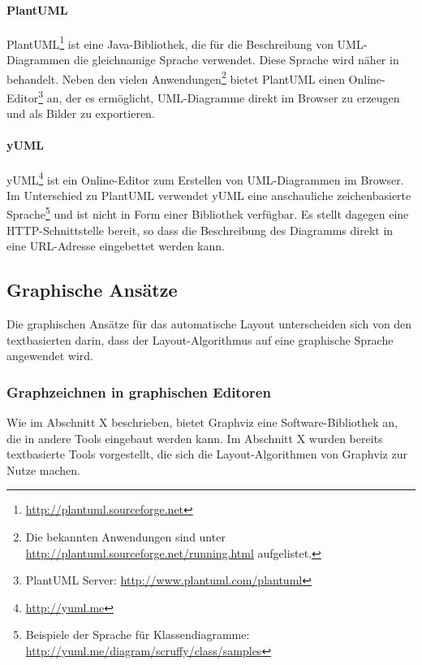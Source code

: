 \paragraph{PlantUML}


PlantUML\footnote{\url{http://plantuml.sourceforge.net}} ist eine Java-Bibliothek, die für die Beschreibung von UML-Diagrammen die gleichnamige Sprache verwendet. Diese Sprache wird näher in \cite{Roques10Drawing} behandelt. Neben den vielen Anwendungen\footnote{Die bekannten Anwendungen sind unter \url{http://plantuml.sourceforge.net/running.html} aufgelistet.} bietet PlantUML einen Online-Editor\footnote{PlantUML Server: \url{http://www.plantuml.com/plantuml}} an, der es ermöglicht, UML-Diagramme direkt im Browser zu erzeugen und als Bilder zu exportieren.

\paragraph{yUML}

yUML\footnote{\url{http://yuml.me}} ist ein Online-Editor zum Erstellen von UML-Diagrammen im Browser. Im Unterschied zu PlantUML verwendet yUML eine anschauliche zeichenbasierte Sprache\footnote{Beispiele der Sprache für Klassendiagramme: \url{http://yuml.me/diagram/scruffy/class/samples}} und ist nicht in Form einer Bibliothek verfügbar. Es stellt dagegen eine HTTP-Schnittstelle bereit, so dass die Beschreibung des Diagramms direkt in eine URL-Adresse eingebettet werden kann.

\subsection{Graphische Ansätze}
\label{subsec:automatic-layout-graphical-approaches}

Die graphischen Ansätze für das automatische Layout unterscheiden sich von den textbasierten darin, dass der Layout-Algorithmus auf eine graphische Sprache angewendet wird.



\subsubsection{Graphzeichnen in graphischen Editoren}

Wie im Abschnitt X beschrieben, bietet Graphviz eine Software-Bibliothek an, die in andere Tools eingebaut werden kann. Im Abschnitt X wurden bereits textbasierte Tools vorgestellt, die sich die Layout-Algorithmen von Graphviz zur Nutze machen. 

